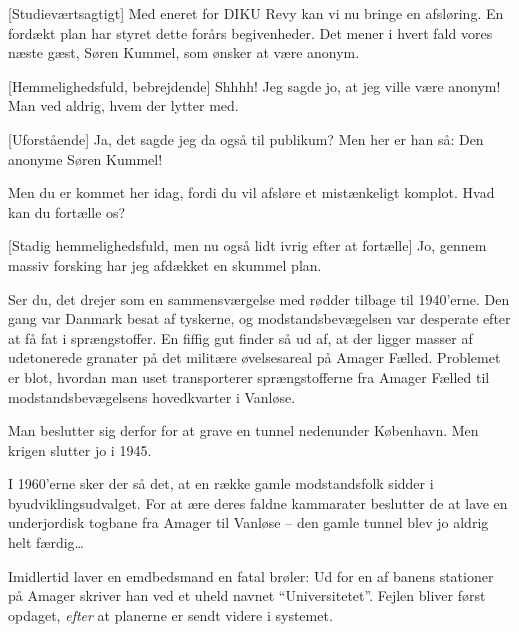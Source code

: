 \documentclass[a4paper,11pt]{article}
\begin{document}
\begin{sketch}

  
  [Studieværtsagtigt] Med eneret for DIKU Revy kan vi nu bringe en
  afsløring. En fordækt plan har styret dette forårs begivenheder. Det mener i
  hvert fald vores næste gæst, Søren Kummel, som ønsker at være anonym.


[Hemmelighedsfuld, bebrejdende] Shhhh! Jeg sagde jo, at jeg ville være
anonym! Man ved aldrig, hvem der lytter med. 

[Uforstående] Ja, det sagde jeg da også til publikum?  Men her er han så: Den anonyme Søren Kummel!

 Men du er kommet her idag, fordi du vil afsløre et mistænkeligt
komplot. Hvad kan du fortælle os?

[Stadig hemmelighedsfuld, men nu også lidt ivrig efter at fortælle]
Jo, gennem massiv forsking har jeg afdækket en skummel plan.

 Ser du, det drejer som en
sammensværgelse med rødder tilbage til 1940'erne. Den gang var Danmark besat af
tyskerne, og modstandsbevægelsen var desperate efter at få fat i sprængstoffer.
En fiffig gut finder så ud af, at der ligger masser af udetonerede granater på
det militære øvelsesareal på Amager Fælled. Problemet er blot, hvordan man uset
transporterer sprængstofferne fra Amager Fælled til modstandsbevægelsens
hovedkvarter i Vanløse. 

Man beslutter sig derfor for at grave en tunnel  nedenunder København.
Men krigen slutter jo i 1945.

I 1960'erne sker der så det, at en række gamle modstandsfolk sidder i
byudviklingsudvalget. For at ære deres faldne kammarater beslutter de at lave en
underjordisk togbane fra Amager til Vanløse -- den gamle tunnel blev jo aldrig
helt færdig\ldots

Imidlertid laver en emdbedsmand en fatal brøler: Ud for en af banens stationer på
Amager skriver han ved et uheld navnet ``Universitetet''. Fejlen bliver først
opdaget, \emph{efter} at planerne er sendt videre i systemet.


\end{sketch}
\end{document}

